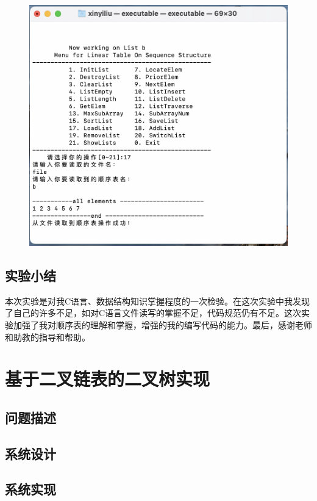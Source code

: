 \documentclass[supercite]{Experimental_Report}
\theoremstyle{definition}
\begin{document}
\begin{enumerate}
\begin{figure}[!htb]
	\end{figure}
	\begin{figure}[!htb]
		\includegraphics[width=0.8\linewidth]{images/截屏2023-06-01 22.20.01.png}
	\end{figure}
	\FloatBarrier
\end{enumerate}

\newpage
\newpage

\subsection{实验小结}
本次实验是对我C语言、数据结构知识掌握程度的一次检验。在这次实验中我发现了自己的许多不足，如对C语言文件读写的掌握不足，代码规范仍有不足。这次实验加强了我对顺序表的理解和掌握，增强的我的编写代码的能力。最后，感谢老师和助教的指导和帮助。

\newpage

\section{基于二叉链表的二叉树实现}


\subsection{问题描述}


\subsection{系统设计}


\subsection{系统实现}
\end{document}

